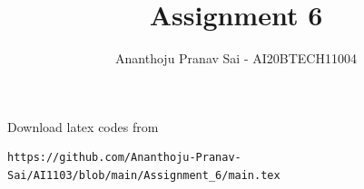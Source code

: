 \documentclass[journal,12pt,twocolumn]{IEEEtran}
\DeclareMathOperator*{\Res}{Res}
\begin{document}
\newcommand{\BEQA}{\begin{eqnarray}}
\newcommand{\EEQA}{\end{eqnarray}}
\newcommand{\define}{\stackrel{\triangle}{=}}

\raggedbottom
\setlength{\parindent}{0pt}
\providecommand{\mbf}{\mathbf}
\providecommand{\pr}[1]{\ensuremath{\Pr\left(#1\right)}}
\providecommand{\qfunc}[1]{\ensuremath{Q\left(#1\right)}}
\providecommand{\sbrak}[1]{\ensuremath{{}\left[#1\right]}}
\providecommand{\lsbrak}[1]{\ensuremath{{}\left[#1\right.}}
\providecommand{\rsbrak}[1]{\ensuremath{{}\left.#1\right]}}
\providecommand{\brak}[1]{\ensuremath{\left(#1\right)}}
\providecommand{\lbrak}[1]{\ensuremath{\left(#1\right.}}
\providecommand{\rbrak}[1]{\ensuremath{\left.#1\right)}}
\providecommand{\cbrak}[1]{\ensuremath{\left\{#1\right\}}}
\providecommand{\lcbrak}[1]{\ensuremath{\left\{#1\right.}}
\providecommand{\rcbrak}[1]{\ensuremath{\left.#1\right\}}}
\theoremstyle{remark}
\newtheorem{rem}{Remark}
\newcommand{\sgn}{\mathop{\mathrm{sgn}}}
\providecommand{\abs}[1]{\vert#1\vert}
\providecommand{\res}[1]{\Res\displaylimits_{#1}} 
\providecommand{\norm}[1]{\lVert#1\rVert}
\providecommand{\mtx}[1]{\mathbf{#1}}
\providecommand{\mean}[1]{E[ #1 ]}
\providecommand{\fourier}{\overset{\mathcal{F}}{ \rightleftharpoons}}
\providecommand{\system}{\overset{\mathcal{H}}{ \longleftrightarrow}}
\newcommand{\solution}{\noindent \textbf{Solution: }}
\newcommand{\cosec}{\,\text{cosec}\,}
\providecommand{\dec}[2]{\ensuremath{\overset{#1}{\underset{#2}{\gtrless}}}}
\newcommand{\myvec}[1]{\ensuremath{\begin{pmatrix}#1\end{pmatrix}}}
\newcommand{\mydet}[1]{\ensuremath{\begin{vmatrix}#1\end{vmatrix}}}
\makeatletter
{}
\makeatother
\let\StandardTheFigure\thefigure
\let\vec\mathbf
\renewcommand{\thefigure}{\theproblem}
\def\putbox#1#2#3{\makebox[0in][l]{\makebox[#1][l]{}\raisebox{\baselineskip}[0in][0in]{\raisebox{#2}[0in][0in]{#3}}}}
     \def\rightbox#1{\makebox[0in][r]{#1}}
     \def\centbox#1{\makebox[0in]{#1}}
     \def\topbox#1{\raisebox{-\baselineskip}[0in][0in]{#1}}
     \def\midbox#1{\raisebox{-0.5\baselineskip}[0in][0in]{#1}}
\vspace{3cm}
\title{Assignment 6}
\author{Ananthoju Pranav Sai - AI20BTECH11004}
\maketitle
\newpage
\bigskip
\renewcommand{\thefigure}{\theenumi}
\renewcommand{\thetable}{\theenumi}
Download latex codes from 
%
\begin{lstlisting}
https://github.com/Ananthoju-Pranav-Sai/AI1103/blob/main/Assignment_6/main.tex
\end{lstlisting}
\end{document}
